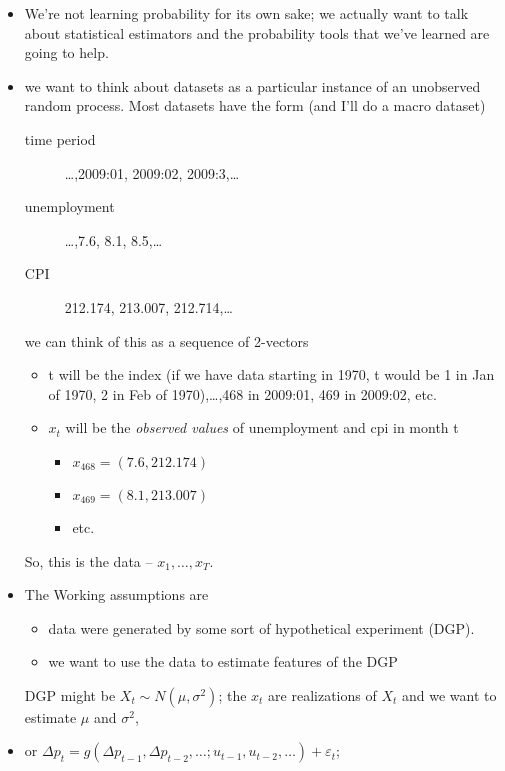 \begin{itemize}

\item We're not learning probability for its own sake; we actually
  want to talk about statistical estimators and the probability tools
  that we've learned are going to help.

\item we want to think about datasets as a particular instance of an
  unobserved random process.  Most datasets have the form (and I'll do
  a macro dataset)
  \begin{description}
  \item[time period] \ldots{},2009:01, 2009:02, 2009:3,\ldots{}
  \item[unemployment] \ldots{},7.6, 8.1, 8.5,\ldots{}
  \item[CPI] 212.174, 213.007, 212.714,\ldots{}
  \end{description}
  we can think of this as a sequence of 2-vectors
  \begin{itemize}
  \item t will be the index (if we have data starting in 1970, t would
    be 1 in Jan of 1970, 2 in Feb of 1970),\ldots{},468 in 2009:01, 469
    in 2009:02, etc.
  \item $x_t$ will be the \emph{observed values} of unemployment and cpi in
    month t
    \begin{itemize}
    \item $x_{468} = (7.6, 212.174)$
    \item $x_{469} = (8.1, 213.007)$
    \item etc.
    \end{itemize}
  \end{itemize}

  So, this is the data -- $x_1,\dots,x_T$.

\item The Working assumptions are
  \begin{itemize}
  \item data were generated by some sort of hypothetical experiment (DGP).
  \item we want to use the data to estimate features of the DGP
  \end{itemize}

  DGP might be $X_t \sim N(\mu, \sigma^2)$; the $x_t$ are realizations
  of $X_t$ and we want to estimate $\mu$ and $\sigma^2$,

\item or $\Delta p_t = g(\Delta p_{t-1}, \Delta p_{t-2}, \dots; u_{t-1}, u_{t-2}, \dots) + \varepsilon_t$;


\end{itemize}

